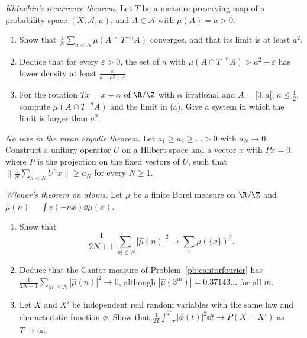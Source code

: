 \begin{exercise}[$\star\star$]\label{pb:khinchinrec}
\emph{Khinchin's recurrence theorem.} Let $T$ be a measure-preserving map of a probability space $(X,\mathcal A,\mu)$, and $A\in\mathcal A$ with $\mu(A)=a>0$.
\begin{enumerate}[label=(\alph*)]
\item Show that $\frac1N\sum_{n<N}\mu(A\cap T^{-n}A)$ converges, and that its limit is at least $a^2$.
\item Deduce that for every $\varepsilon>0$, the set of $n$ with $\mu(A\cap T^{-n}A)>a^2-\varepsilon$ has lower density at least $\frac\varepsilon{a-a^2+\varepsilon}$.
\item For the rotation $Tx=x+\alpha$ of $\R/\Z$ with $\alpha$ irrational and $A=[0,a[$, $a\le\frac12$, compute $\mu(A\cap T^{-n}A)$ and the limit in (a). Give a
system in which the limit is larger than $a^2$.
\end{enumerate}
\end{exercise}

\begin{exercise}[$\star\star$]\label{pb:norate}
\emph{No rate in the mean ergodic theorem.} Let $a_1\ge a_2\ge\dots>0$ with $a_N\to0$. Construct a unitary operator $U$ on a Hilbert space and a vector $x$
with $Px=0$, where $P$ is the projection on the fixed vectors of $U$, such that $\bigl\|\frac1N\sum_{n<N}U^nx\bigr\|\ge a_N$ for every $N\ge1$.
\end{exercise}

\begin{exercise}[$\star\star$]\label{pb:wiener}
\emph{Wiener's theorem on atoms.} Let $\mu$ be a finite Borel measure on $\R/\Z$ and $\hat\mu(n)=\int e(-nx)\dd\mu(x)$.
\begin{enumerate}[label=(\alph*)]
\item Show that
\[
\frac1{2N+1}\sum_{|n|\le N}|\hat\mu(n)|^2\longrightarrow\sum_x\mu(\{x\})^2.
\]
\item Deduce that the Cantor measure of Problem~\ref{pb:cantorfourier} has $\frac1{2N+1}\sum_{|n|\le N}|\hat\mu(n)|^2\to0$, although $|\hat\mu(3^m)|=0.37143\ldots$ for all $m$.
\item Let $X$ and $X'$ be independent real random variables with the same law and characteristic function $\phi$. Show that
$\frac1{2T}\int_{-T}^T|\phi(t)|^2\dd t\to P(X=X')$ as $T\to\infty$.
\end{enumerate}
\end{exercise}

